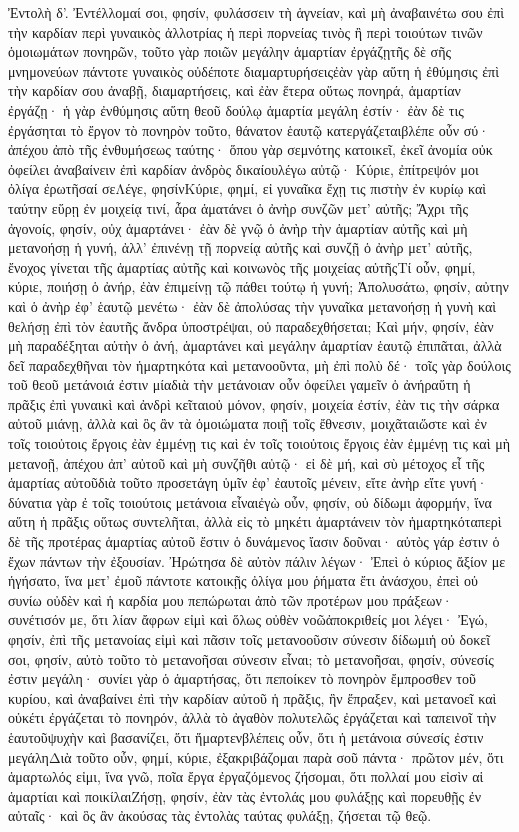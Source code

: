 Ἐντολὴ δ’.
Ἐντέλλομαί σοι, φησίν, φυλάσσειν τὴ ἁγνείαν, καὶ μὴ ἀναβαινέτω σου ἐπὶ τὴν καρδίαν περὶ γυναικὸς ἀλλοτρίας ἡ περὶ πορνείας τινὸς ἢ περὶ τοιούτων τινῶν ὁμοιωμάτων πονηρῶν, τοῦτο γὰρ ποιῶν μεγάλην ἁμαρτίαν ἐργάζῃτῆς δὲ σῆς μνημονεύων πάντοτε γυναικὸς οὐδέποτε διαμαρτυρήσειςἐὰν γὰρ αὕτη ἡ ἐθύμησις ἐπὶ τὴν καρδίαν σου ἀναβῇ, διαμαρτήσεις, καὶ ἐὰν ἕτερα οὕτως πονηρά, ἁμαρτίαν ἐργάζῃ· ἡ γὰρ ἐνθύμησις αὕτη θεοῦ δούλῳ ἁμαρτία μεγάλη ἐστίν· ἐὰν δὲ τις ἐργάσηται τὸ ἔργον τὸ πονηρὸν τοῦτο, θάνατον ἑαυτῷ κατεργάζεταιβλέπε οὖν σύ· ἀπέχου ἀπὸ τῆς ἐνθυμήσεως ταύτης· ὅπου γὰρ σεμνότης κατοικεῖ, ἐκεῖ ἀνομία οὐκ ὀφείλει ἀναβαίνειν ἐπὶ καρδίαν ἀνδρὸς δικαίουλέγω αὐτῷ· Κύριε, ἐπίτρεψόν μοι ὀλίγα ἐρωτῆσαί σεΛέγε, φησίνΚύριε, φημί, εἰ γυναῖκα ἔχῃ τις πιστὴν ἐν κυρίῳ καὶ ταύτην εὕρῃ ἐν μοιχείᾳ τινί, ἆρα ἁματάνει ὁ ἀνὴρ συνζῶν μετ’ αὐτῆς; Ἄχρι τῆς ἀγονοίς, φησίν, οὐχ ἁμαρτάνει· ἐὰν δὲ γνῷ ὁ ἀνὴρ τὴν ἁμαρτίαν αὐτῆς καὶ μὴ μετανοήσῃ ἡ γυνή, ἀλλ’ ἐπινένῃ τῇ πορνείᾳ αὐτῆς καὶ συνζῇ ὁ ἀνὴρ μετ’ αὐτῆς, ἔνοχος γίνεται τῆς ἁμαρτίας αὐτῆς καὶ κοινωνὸς τῆς μοιχείας αὐτῆςΤί οὖν, φημί, κύριε, ποιήσῃ ὁ ἀνήρ, ἐὰν ἐπιμείνῃ τῷ πάθει τούτῳ ἡ γυνή; Ἀπολυσάτω, φησίν, αὐτην καὶ ὁ ἀνὴρ ἐφ’ ἑαυτῷ μενέτω· ἐὰν δὲ ἀπολύσας τὴν γυναῖκα μετανοήσῃ ἡ γυνὴ καὶ θελήσῃ ἐπὶ τὸν ἑαυτῆς ἄνδρα ὑποστρέψαι, οὐ παραδεχθήσεται; Καὶ μήν, φησίν, ἐὰν μὴ παραδέξηται αὐτὴν ὁ ἀνή, ἁμαρτάνει καὶ μεγάλην ἁμαρτίαν ἑαυτῷ ἐπιπᾶται, ἀλλὰ δεῖ παραδεχθῆναι τὸν ἡμαρτηκότα καὶ μετανοοῦντα, μὴ ἐπὶ πολὺ δέ· τοῖς γὰρ δούλοις τοῦ θεοῦ μετάνοιά ἐστιν μίαδιὰ τὴν μετάνοιαν οὖν ὀφείλει γαμεῖν ὁ ἀνήραὕτη ἡ πρᾶξις ἐπὶ γυναικὶ καὶ ἀνδρὶ κεῖταιοὐ μόνον, φησίν, μοιχεία ἐστίν, ἐὰν τις τὴν σάρκα αὐτοῦ μιάνῃ, ἀλλὰ καὶ ὃς ἂν τὰ ὁμοιώματα ποιῇ τοῖς ἔθνεσιν, μοιχᾶταιὥστε καὶ ἐν τοῖς τοιοὐτοις ἔργοις ἐὰν ἐμμένῃ τις καὶ ἐν τοῖς τοιοὐτοις ἔργοις ἐὰν ἐμμένῃ τις καὶ μὴ μετανοῇ, ἀπέχου ἀπ’ αὐτοῦ καὶ μὴ συνζῆθι αὐτῷ· εἰ δὲ μή, καὶ σὺ μέτοχος εἶ τῆς ἁμαρτίας αὐτοῦδιὰ τοῦτο προσετάγη ὑμῖν ἐφ’ ἐαυτοῖς μένειν, εἴτε ἀνὴρ εἴτε γυνή· δύνατια γὰρ ἐ τοῖς τοιούτοις μετάνοια εἶναιἐγὼ οὖν, φησίν, οὐ δίδωμι ἀφορμήν, ἵνα αὕτη ἡ πρᾶξις οὕτως συντελῆται, ἀλλὰ εἰς τὸ μηκέτι ἁμαρτάνειν τὸν ἡμαρτηκόταπερὶ δὲ τῆς προτέρας ἁμαρτίας αὐτοῦ ἔστιν ὁ δυνάμενος ἴασιν δοῦναι· αὐτὸς γάρ ἐστιν ὁ ἔχων πάντων τὴν ἐξουσίαν.
Ἠρώτησα δὲ αὐτὸν πάλιν λέγων· Ἐπεὶ ὁ κύριος ἄξίον με ἡγήσατο, ἵνα μετ’ ἐμοῦ πάντοτε κατοικῇς ὀλίγα μου ῥήματα ἔτι ἀνάσχου, ἐπεὶ οὐ συνίω οὐδὲν καὶ ἡ καρδία μου πεπώρωται ἀπὸ τῶν προτέρων μου πράξεων· συνέτισόν με, ὅτι λίαν ἄφρων εἰμὶ καὶ ὅλως οὐθὲν νοῶἀποκριθείς μοι λέγει· Ἐγώ, φησίν, ἐπὶ τῆς μετανοίας εἰμὶ καὶ πᾶσιν τοῖς μετανοοῦσιν σύνεσιν δίδωμιἡ οὐ δοκεῖ σοι, φησίν, αὐτὸ τοῦτο τὸ μετανοῆσαι σύνεσιν εἶναι; τὸ μετανοῆσαι, φησίν, σύνεσίς ἐστιν μεγάλη· συνίει γὰρ ὁ ἁμαρτήσας, ὅτι πεποίκεν τὸ πονηρὸν ἔμπροσθεν τοῦ κυρίου, καὶ ἀναβαίνει ἐπὶ τὴν καρδίαν αὐτοῦ ἡ πρᾶξις, ἣν ἔπραξεν, καὶ μετανοεῖ καὶ οὐκέτι ἐργάζεται τὸ πονηρόν, ἀλλὰ τὸ ἀγαθὸν πολυτελῶς ἐργάζεται καὶ ταπεινοῖ τὴν ἑαυτοῦψυχὴν καὶ βασανίζει, ὅτι ἥμαρτενβλέπεις οὖν, ὅτι ἡ μετάνοια σύνεσίς ἐστιν μεγάληΔιὰ τοῦτο οὖν, φημί, κύριε, ἐξακριβάζομαι παρὰ σοῦ πάντα· πρῶτον μέν, ὅτι ἁμαρτωλός εἰμι, ἵνα γνῶ, ποῖα ἔργα ἐργαζόμενος ζήσομαι, ὅτι πολλαί μου εἰσὶν αἱ ἁμαρτίαι καὶ ποικίλαιΖήσῃ, φησίν, ἐὰν τὰς ἐντολάς μου φυλάξῃς καὶ πορευθῇς ἐν αὐταῖς· καὶ ὃς ἂν ἀκούσας τὰς ἐντολὰς ταύτας φυλάξῃ, ζήσεται τῷ θεῷ.
